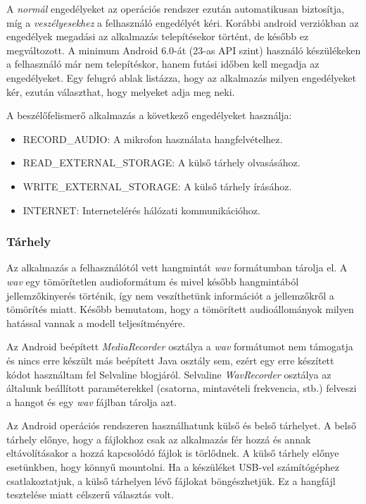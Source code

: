 A \emph{normál} engedélyeket az operációs rendszer ezután automatikusan biztosítja, míg a \emph{veszélyesekhez} a felhasználó engedélyét kéri. Korábbi android verziókban az engedélyek megadási az alkalmazás telepítésekor történt, de később ez megváltozott. A minimum Android 6.0-át (23-as API szint) használó készülékeken a felhasználó már nem telepítéskor, hanem futási időben kell megadja az engedélyeket. Egy felugró ablak listázza, hogy az alkalmazás milyen engedélyeket kér, ezután választhat, hogy melyeket adja meg neki.

A beszélőfelismerő alkalmazás a következő engedélyeket használja:

\begin{itemize}
	\item RECORD\_AUDIO: A mikrofon használata hangfelvételhez.
	\item READ\_EXTERNAL\_STORAGE: A külső tárhely olvasásához.
	\item WRITE\_EXTERNAL\_STORAGE: A külső tárhely írásához.
	\item INTERNET: Internetelérés hálózati kommunikációhoz.
\end{itemize}

\subsubsection{Tárhely}

Az alkalmazás a felhasználótól vett hangmintát \emph{wav} formátumban tárolja el. A \emph{wav} egy tömörítetlen audioformátum és mivel később hangmintából jellemzőkinyerés történik, így nem veszíthetünk információt a jellemzőkről a tömörítés miatt. Később bemutatom, hogy a tömörített audioállományok milyen hatással vannak a modell teljesítményére.

Az Android beépített \emph{MediaRecorder} osztálya a \emph{wav} formátumot nem támogatja és nincs erre készült más beépített Java osztály sem, ezért egy erre készített kódot használtam fel Selvaline blogjáról. Selvaline \emph{WavRecorder} osztálya az általunk beállított paraméterekkel (csatorna, mintavételi frekvencia, stb.) felveszi a hangot és egy \emph{wav} fájlban tárolja azt.

Az Android operációs rendszeren használhatunk külső és belső tárhelyet. A belső tárhely előnye, hogy a fájlokhoz csak az alkalmazás fér hozzá és annak eltávolításakor a hozzá kapcsolódó fájlok is törlődnek. A külső tárhely előnye esetünkben, hogy könnyű mountolni. Ha a készüléket USB-vel számítógéphez csatlakoztatjuk, a külső tárhelyen lévő fájlokat böngészhetjük. Ez a hangfájl tesztelése miatt célszerű választás volt. 



